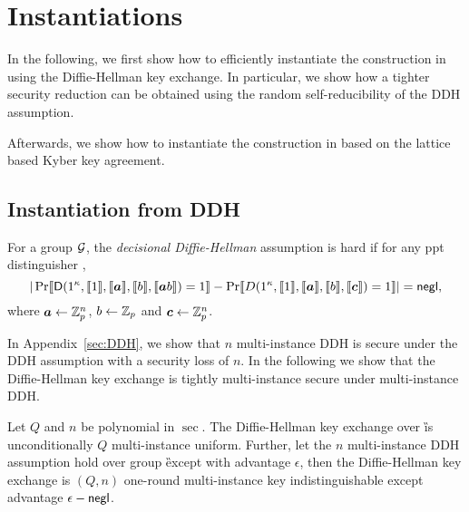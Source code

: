 \section{Instantiations}\label{sec:inst}
In the following, we first show how to efficiently instantiate the construction in  using the Diffie-Hellman key exchange. In particular, we show how a tighter security reduction can be obtained using the random self-reducibility of the DDH assumption.

Afterwards, we show how to instantiate the construction in  based on the lattice based Kyber key agreement. 


\subsection{Instantiation from DDH}



\begin{definition}
For a group $\mathcal{G}$, the \emph{decisional Diffie-Hellman} assumption is hard if for any ppt distinguisher \D,
$$
|\Pr\lb \D(1^\sec,\lb 1\rb,\lb \vec{a}\rb,\lb b\rb,\lb \vec{a}b\rb)=1\rb-\Pr\lb D(1^\sec,\lb 1\rb,\lb \vec{a}\rb,\lb b\rb,\lb \vec{c}\rb)=1\rb|=\negl,
$$
where $\vec{a}\leftarrow\Z_p^n$, $b\leftarrow\mathbb Z_p$ and $\vec{c}\leftarrow\Z_p^n$.
\end{definition}

In Appendix~\ref{sec:DDH}, we show that $n$ multi-instance DDH is secure under the DDH assumption with a security loss of $n$. In the following we show that the Diffie-Hellman key exchange is tightly multi-instance secure under multi-instance DDH. 

\begin{lemma}\label{lem:DDH}
Let $Q$ and $n$ be polynomial in $\sec$.
The Diffie-Hellman key exchange over \G is unconditionally $Q$ multi-instance uniform. Further, let the $n$ multi-instance DDH assumption hold over group \G except with advantage $\epsilon$, then the Diffie-Hellman key exchange is $(Q,n)$ one-round multi-instance key indistinguishable except advantage $\epsilon-\mathsf{negl}$. 
\end{lemma}

